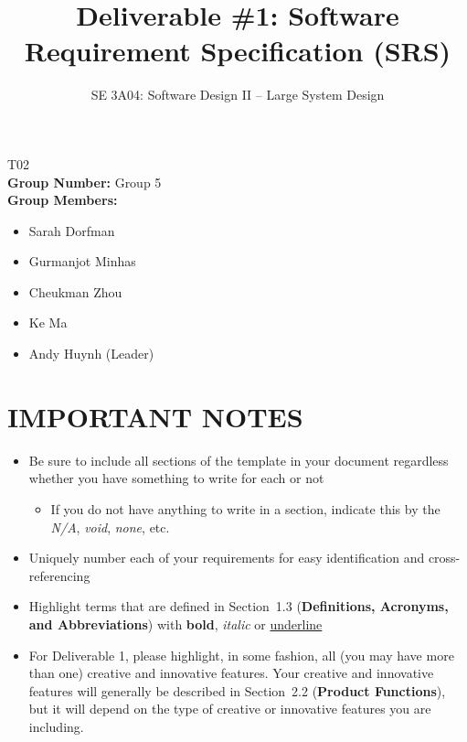 \documentclass[]{article}
\title{Deliverable \#1: Software Requirement Specification (SRS)}
\author{SE 3A04: Software Design II -- Large System Design}
\date{}
\begin{document}
\maketitle	
{} T02\\
{\bf Group Number:} Group 5 \\
{\bf Group Members:} 
\begin{itemize}
	\item Sarah Dorfman
	\item Gurmanjot Minhas
	\item Cheukman Zhou
	\item Ke Ma
	\item Andy Huynh (Leader)
\end{itemize}

\section*{IMPORTANT NOTES}
\begin{itemize}
	\item Be sure to include all sections of the template in your document regardless whether you have something to write for each or not
	\begin{itemize}
		\item If you do not have anything to write in a section, indicate this by the \emph{N/A}, \emph{void}, \emph{none}, etc.
	\end{itemize}
	\item Uniquely number each of your requirements for easy identification and cross-referencing
	\item Highlight terms that are defined in Section~1.3 (\textbf{Definitions, Acronyms, and Abbreviations}) with \textbf{bold}, \emph{italic} or \underline{underline}
	\item For Deliverable 1, please highlight, in some fashion, all (you may have more than one) creative and innovative features. Your creative and innovative features will generally be described in Section~2.2 (\textbf{Product Functions}), but it will depend on the type of creative or innovative features you are including.
\end{itemize}

\newpage



















\end{document}
